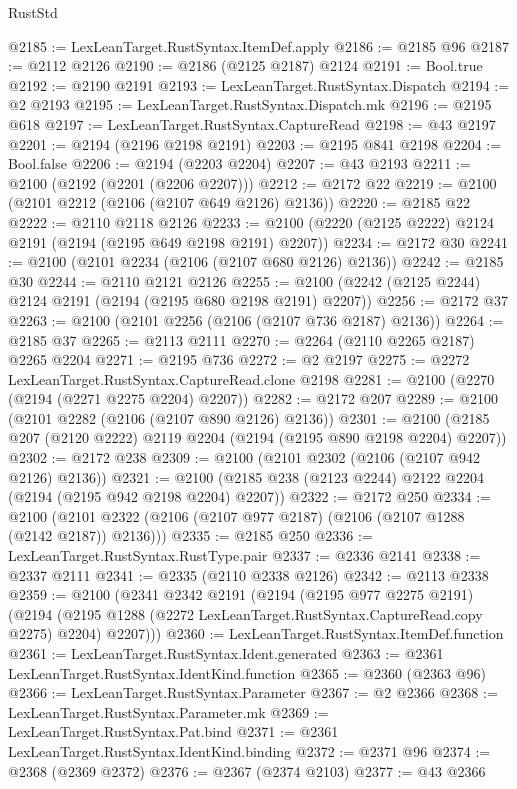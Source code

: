 \begin{lexlean}{RustStd}
\begin{coremodule}
{\begin{coremodule}
{{{{{{{{{{{{{{{{{{{{{{{{{{{{{{{{{{{{{{{{{{{{{{{{{{@2185 := LexLeanTarget.RustSyntax.ItemDef.apply
@2186 := @2185 @96
@2187 := @2112 @2126
@2190 := @2186 (@2125 @2187) @2124
@2191 := Bool.true
@2192 := @2190 @2191
@2193 := LexLeanTarget.RustSyntax.Dispatch
@2194 := @2 @2193
@2195 := LexLeanTarget.RustSyntax.Dispatch.mk
@2196 := @2195 @618
@2197 := LexLeanTarget.RustSyntax.CaptureRead
@2198 := @43 @2197
@2201 := @2194 (@2196 @2198 @2191)
@2203 := @2195 @841 @2198
@2204 := Bool.false
@2206 := @2194 (@2203 @2204)
@2207 := @43 @2193
@2211 := @2100 (@2192 (@2201 (@2206 @2207)))
@2212 := @2172 @22
@2219 := @2100 (@2101 @2212 (@2106 (@2107 @649 @2126) @2136))
@2220 := @2185 @22
@2222 := @2110 @2118 @2126
@2233 := @2100 (@2220 (@2125 @2222) @2124 @2191 (@2194 (@2195 @649 @2198 @2191) @2207))
@2234 := @2172 @30
@2241 := @2100 (@2101 @2234 (@2106 (@2107 @680 @2126) @2136))
@2242 := @2185 @30
@2244 := @2110 @2121 @2126
@2255 := @2100 (@2242 (@2125 @2244) @2124 @2191 (@2194 (@2195 @680 @2198 @2191) @2207))
@2256 := @2172 @37
@2263 := @2100 (@2101 @2256 (@2106 (@2107 @736 @2187) @2136))
@2264 := @2185 @37
@2265 := @2113 @2111
@2270 := @2264 (@2110 @2265 @2187) @2265 @2204
@2271 := @2195 @736
@2272 := @2 @2197
@2275 := @2272 LexLeanTarget.RustSyntax.CaptureRead.clone @2198
@2281 := @2100 (@2270 (@2194 (@2271 @2275 @2204) @2207))
@2282 := @2172 @207
@2289 := @2100 (@2101 @2282 (@2106 (@2107 @890 @2126) @2136))
@2301 := @2100 (@2185 @207 (@2120 @2222) @2119 @2204 (@2194 (@2195 @890 @2198 @2204) @2207))
@2302 := @2172 @238
@2309 := @2100 (@2101 @2302 (@2106 (@2107 @942 @2126) @2136))
@2321 := @2100 (@2185 @238 (@2123 @2244) @2122 @2204 (@2194 (@2195 @942 @2198 @2204) @2207))
@2322 := @2172 @250
@2334 := @2100 (@2101 @2322 (@2106 (@2107 @977 @2187) (@2106 (@2107 @1288 (@2142 @2187)) @2136)))
@2335 := @2185 @250
@2336 := LexLeanTarget.RustSyntax.RustType.pair
@2337 := @2336 @2141
@2338 := @2337 @2111
@2341 := @2335 (@2110 @2338 @2126)
@2342 := @2113 @2338
@2359 := @2100
    (@2341
      @2342
      @2191
      (@2194
        (@2195 @977 @2275 @2191)
        (@2194 (@2195 @1288 (@2272 LexLeanTarget.RustSyntax.CaptureRead.copy @2275) @2204) @2207)))
@2360 := LexLeanTarget.RustSyntax.ItemDef.function
@2361 := LexLeanTarget.RustSyntax.Ident.generated
@2363 := @2361 LexLeanTarget.RustSyntax.IdentKind.function
@2365 := @2360 (@2363 @96)
@2366 := LexLeanTarget.RustSyntax.Parameter
@2367 := @2 @2366
@2368 := LexLeanTarget.RustSyntax.Parameter.mk
@2369 := LexLeanTarget.RustSyntax.Pat.bind
@2371 := @2361 LexLeanTarget.RustSyntax.IdentKind.binding
@2372 := @2371 @96
@2374 := @2368 (@2369 @2372)
@2376 := @2367 (@2374 @2103)
@2377 := @43 @2366
}}}}}}}}}}}}}}}}}}}}}}}}}}}}}}}}}}}}}}}}}}}}}}}}}}
\end{coremodule}}
\end{coremodule}
\end{lexlean}

